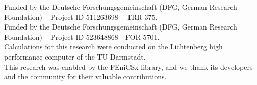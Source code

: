 \documentclass[pdflatex,sn-mathphys-num]{sn-jnl}%
\theoremstyle{thmstyleone}%
\theoremstyle{thmstyletwo}%
\theoremstyle{thmstylethree}%
\begin{document}











  Funded by the Deutsche Forschungsgemeinschaft (DFG, German Research Foundation) – Project-ID 511263698 – TRR 375.\\
  Funded by the Deutsche Forschungsgemeinschaft (DFG, German Research Foundation) – Project-ID 523648868 - FOR 5701.\\
  Calculations for this research were conducted on the Lichtenberg high performance computer of the TU Darmstadt. \\
This research was enabled by the FEniCSx library, and we thank its developers and the community for their valuable contributions.\\
\end{document}
